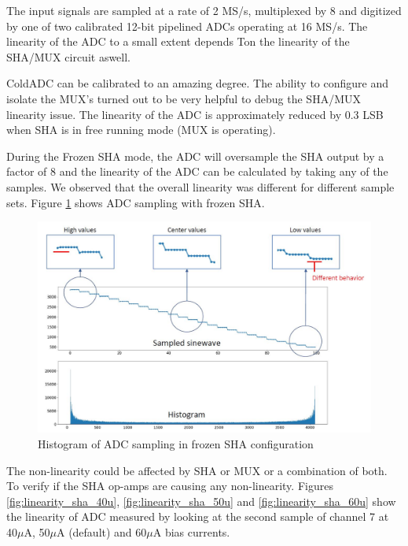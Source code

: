 \label{sec:5.4}


The input signals are sampled at a rate of 2 MS/s, multiplexed by 8 and digitized by one of two calibrated 12-bit pipelined ADCs operating at 16 MS/s. The linearity of the ADC to a small extent depends Ton the linearity of the SHA/MUX circuit aswell. 

ColdADC can be calibrated to an amazing degree. The ability to configure and isolate the MUX's turned out to be very helpful to debug the SHA/MUX linearity issue. The linearity of the ADC is approximately reduced by 0.3 LSB when SHA is in free running mode (MUX is operating). 


During the Frozen SHA mode, the ADC will oversample the SHA output by a factor of 8 and the linearity of the ADC can be calculated by taking any of the samples. We observed that the overall linearity was different for different sample sets. Figure \ref{fig:sha_sample_hist} shows ADC sampling with frozen SHA.

\begin{figure}[h!]
\centering
  \includegraphics[width=0.7\linewidth]{figures/prakash_fig/sha_sample_hist.JPG}
  \caption{Histogram of ADC sampling in frozen SHA configuration}
  \label{fig:sha_sample_hist}
\end{figure}

The non-linearity could be affected by SHA or MUX or a combination of both. To verify if the SHA op-amps are causing any non-linearity. Figures \ref{fig:linearity_sha_40u}, \ref{fig:linearity_sha_50u} and \ref{fig:linearity_sha_60u} show the linearity of ADC measured by looking at the second sample of channel 7 at 40$\mu$A, 50$\mu$A (default) and 60$\mu$A bias currents. 

